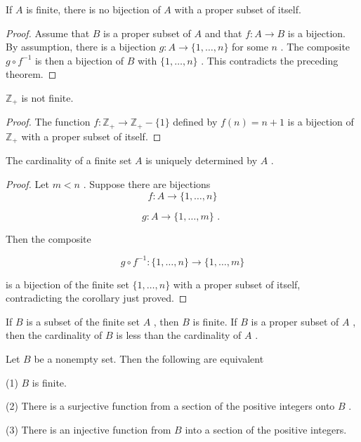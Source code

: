 \begin{corollary} If \(A\) is finite, there is no bijection of \(A\) with a proper subset of itself.
\end{corollary}

\begin{proof}Assume that \(B\) is a proper subset of \(A\) and that \(f : A \rightarrow  B\) is a bijection. By assumption, there is a bijection \(g : A \rightarrow  \{ 1,\ldots ,n\}\) for some \(n\) . The composite \(g \circ  {f}^{-1}\) is then a bijection of \(B\) with \(\{ 1,\ldots ,n\}\) . This contradicts the preceding theorem.\end{proof}
\begin{corollary} \({\mathbb{Z}}_{ + }\) is not finite.
\end{corollary}

\begin{proof}The function \(f : {\mathbb{Z}}_{ + } \rightarrow  {\mathbb{Z}}_{ + } - \{ 1\}\) defined by \(f\left( n\right)  = n + 1\) is a bijection of \({\mathbb{Z}}_{ + }\) with a proper subset of itself.\end{proof}
\begin{corollary} The cardinality of a finite set \(A\) is uniquely determined by \(A\) .
\end{corollary}

\begin{proof}Let \(m < n\) . Suppose there are bijections
\[
f : A \rightarrow  \{ 1,\ldots ,n\}
\]

\[
g : A \rightarrow  \{ 1,\ldots ,m\} \text{ . }
\]

Then the composite

\[
g \circ  {f}^{-1} : \{ 1,\ldots ,n\}  \rightarrow  \{ 1,\ldots ,m\}
\]

is a bijection of the finite set \(\{ 1,\ldots ,n\}\) with a proper subset of itself, contradicting the corollary just proved.
\end{proof}
\begin{corollary} If \(B\) is a subset of the finite set \(A\) , then \(B\) is finite. If \(B\) is a proper subset of \(A\) , then the cardinality of \(B\) is less than the cardinality of \(A\) .
\end{corollary}

\begin{corollary} Let \(B\) be a nonempty set. Then the following are equivalent

(1) \(B\) is finite.

(2) There is a surjective function from a section of the positive integers onto \(B\) .

(3) There is an injective function from \(B\) into a section of the positive integers.
\end{corollary}

